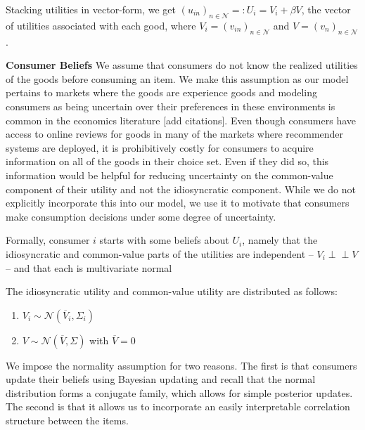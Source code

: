\documentclass[sigconf]{acmart}
\begin{document}
Stacking utilities in vector-form, we get ${\left(u_{in}\right)}_{n \in \mathcal{N}}=:U_i=V_i+ \beta V $, the vector of utilities associated with each good, where $V_i ={\left(v_{in}\right)}_{n \in \mathcal{N}}$ and $V={\left(v_{n}\right)}_{n \in \mathcal{N}}$.
\par
\noindent \textbf{Consumer Beliefs} We assume that consumers do not know the realized utilities of the goods before consuming an item. We make this assumption as our model pertains to markets where the goods are experience goods and modeling consumers as being uncertain over their preferences in these environments  is common in the economics literature [add citations]. Even though consumers have access to online reviews for goods in many of the markets where recommender systems are deployed, it is prohibitively costly for consumers to acquire information on all of the goods in their choice set. Even if they did so, this information would be helpful for reducing uncertainty on the common-value component of their utility and not the idiosyncratic component. While we do not explicitly incorporate this into our model, we use it to motivate that consumers make consumption decisions under some degree of uncertainty.

Formally, consumer $i$ starts with some beliefs about $U_i$, namely that the idiosyncratic and common-value parts of the utilities are independent -- $V_i \perp \!\!\! \perp V$ -- and that each is multivariate normal
\begin{definition} The idiosyncratic utility and common-value utility are distributed as follows:
\begin{center}
\begin{enumerate}
\item $V_i \sim \mathcal N (\overline V_i, \Sigma_i)$ 
\item $V \sim \mathcal N(\overline V, \Sigma)$ with $\overline V =0$
\end{enumerate}
\end{center}
\end{definition}

We impose the normality assumption for two reasons. The first is that consumers update their beliefs using Bayesian updating and recall that the normal distribution forms a conjugate family, which allows for simple posterior updates. The second is that it allows us to incorporate an easily interpretable correlation structure between the items.
\end{document}
